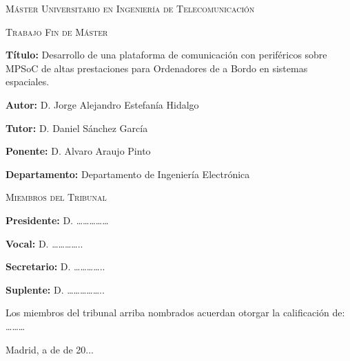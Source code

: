 \begin{titlepage}
\Large{\textsc{\textcolor{nar}{Máster Universitario en Ingeniería de Telecomunicación}}} \par
\vspace{0.3cm}
\colorbox{nar}{\Large{\textsc{Trabajo Fin de Máster}}} \par
\vspace{0.2cm}
\normalsize{\textbf{Título:} Desarrollo de una plataforma de comunicación con periféricos sobre MPSoC de altas prestaciones para Ordenadores de a Bordo en sistemas espaciales.} \par
\vspace{0.2cm}
\normalsize{\textbf{Autor:} D. Jorge Alejandro Estefanía Hidalgo} \par
\vspace{0.2cm}
\normalsize{\textbf{Tutor:} D. Daniel Sánchez García} \par
\vspace{0.2cm}
\normalsize{\textbf{Ponente:} D. Alvaro Araujo Pinto} \par
\vspace{0.2cm}
\normalsize{\textbf{Departamento:} Departamento de Ingeniería Electrónica} \par
\vspace{1cm}
\colorbox{nar}{\Large{\textsc{Miembros del Tribunal}}} \par
\vspace{0.2cm}
\normalsize{\textbf{Presidente:} D. ……………} \par
\vspace{0.2cm}
\normalsize{\textbf{Vocal:} D. …………..} \par
\vspace{0.2cm}
\normalsize{\textbf{Secretario:} D. …………..} \par
\vspace{0.2cm}
\normalsize{\textbf{Suplente:} D. ……………..} \par
\vspace{0.8cm}
\normalsize{\quad \quad \quad Los miembros del tribunal arriba nombrados acuerdan otorgar la calificación de: ………} \par
\vspace{2cm}
\flushright
\normalsize{Madrid, a \quad \quad\quad de \quad \quad\quad\quad\quad\quad\quad de 20...} \par
\end{titlepage}
